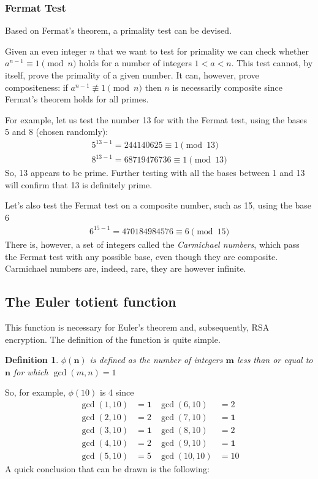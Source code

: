 \documentclass[12pt, titlepage]{article}
\newtheorem*{definition}{Definition}
\begin{document}
\subsubsection{Fermat Test}

Based on Fermat's theorem, a primality test can be devised.

Given an even integer $n$ that we want to test for primality we can check whether $a^{n-1}
\equiv 1 \pmod{n}$ holds for a number of integers $1<a<n$.  This test cannot, by itself,
prove the primality of a given number. It can, however, prove compositeness: if $a^{n-1}
\not\equiv 1 \pmod{n}$ then $n$ is necessarily composite since Fermat's theorem holds for
all primes. \cite{primality_akalin}

For example, let us test the number 13 for with the Fermat test, using the bases 5 and 8
(chosen randomly):
%
\begin{align*}
    5^{13-1} = 244140625   \equiv 1 \pmod{13}\\
    8^{13-1} = 68719476736 \equiv 1 \pmod{13}
\end{align*}
%
So, 13 appears to be prime. Further testing with all the bases between 1 and 13 will confirm
that 13 is definitely prime.

Let's also test the Fermat test on a composite number, such as 15, using the base 6
%
\begin{align*}
    6^{15-1} = 470184984576 \equiv 6 \pmod{15}
\end{align*}
%
There is, however, a set of integers called the \emph{Carmichael numbers}, which pass the
Fermat test with any possible base, even though they are composite. Carmichael numbers are,
indeed, rare, they are however infinite. \autocite[116]{dence}

\subsection{The Euler totient function}

This function is necessary for Euler's theorem and, subsequently, RSA encryption. The
definition of the function is quite simple.
%
\begin{definition}
    $\phi(\mathbf{n})$ is defined as the \emph{number} of integers $\mathbf{m}$ less than or
    equal to $\mathbf{n}$ for which $\gcd(m, n) = 1$
\end{definition}
%
So, for example, $\phi(10)$ is 4 since 
%
\begin{align*}
    \gcd(1, 10) &= \mathbf{1} &\gcd(6, 10) &= 2\\
    \gcd(2, 10) &= 2          &\gcd(7, 10) &= \mathbf{1}\\
    \gcd(3, 10) &= \mathbf{1} &\gcd(8, 10) &= 2\\
    \gcd(4, 10) &= 2          &\gcd(9, 10) &= \mathbf{1}\\
    \gcd(5, 10) &= 5          &\gcd(10, 10) &= 10
\end{align*}
%
A quick conclusion that can be drawn is the following:
\end{document}
